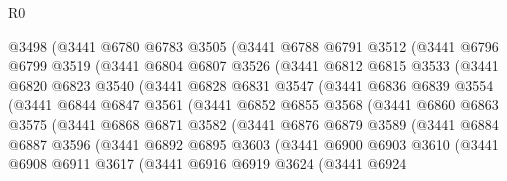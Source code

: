 \begin{lexlean}{R0}
\begin{coremodule}
          @3498
          (@3441
            @6780
            @6783
            @3505
            (@3441
              @6788
              @6791
              @3512
              (@3441
                @6796
                @6799
                @3519
                (@3441
                  @6804
                  @6807
                  @3526
                  (@3441
                    @6812
                    @6815
                    @3533
                    (@3441
                      @6820
                      @6823
                      @3540
                      (@3441
                        @6828
                        @6831
                        @3547
                        (@3441
                          @6836
                          @6839
                          @3554
                          (@3441
                            @6844
                            @6847
                            @3561
                            (@3441
                              @6852
                              @6855
                              @3568
                              (@3441
                                @6860
                                @6863
                                @3575
                                (@3441
                                  @6868
                                  @6871
                                  @3582
                                  (@3441
                                    @6876
                                    @6879
                                    @3589
                                    (@3441
                                      @6884
                                      @6887
                                      @3596
                                      (@3441
                                        @6892
                                        @6895
                                        @3603
                                        (@3441
                                          @6900
                                          @6903
                                          @3610
                                          (@3441
                                            @6908
                                            @6911
                                            @3617
                                            (@3441
                                              @6916
                                              @6919
                                              @3624
                                              (@3441
                                                @6924

\end{coremodule}
\end{lexlean}
